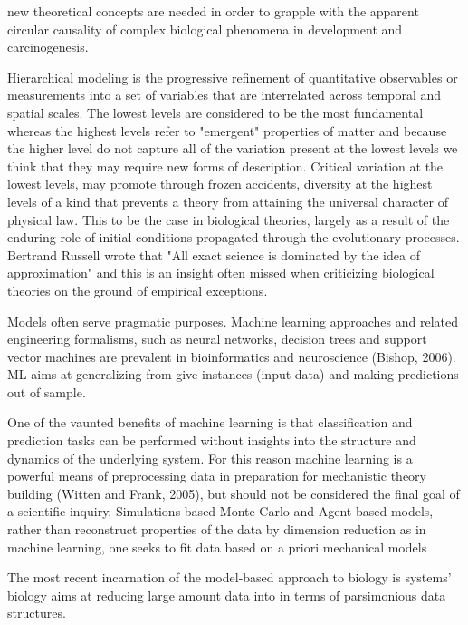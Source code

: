 \documentclass[onecollarge,runningheads]{svjour2}
\begin{document}
new theoretical concepts are needed in order to grapple with the apparent circular causality of complex biological phenomena in development and carcinogenesis.

Hierarchical  modeling is the progressive refinement of quantitative observables or measurements into a set of variables that are interrelated across temporal and spatial scales. The lowest levels are considered to be the most fundamental whereas the highest levels refer to "emergent" properties of matter and because the higher level do not capture all of the variation present at the lowest levels we think that they may require new forms of description.
Critical variation at the lowest levels, may promote through frozen accidents, diversity at the highest levels of a kind that prevents a theory from attaining the universal character of physical law.
This to be the case in biological theories, largely as a result of the enduring role of initial conditions propagated through the evolutionary processes. Bertrand Russell wrote that "All exact science is dominated by the idea of approximation" and this is an insight often missed when criticizing biological theories on the ground of empirical exceptions.

Models often serve pragmatic purposes. Machine learning approaches and related engineering formalisms, such as neural networks, decision trees and support vector machines are prevalent in bioinformatics and neuroscience (Bishop, 2006). ML aims at generalizing from give instances (input data) and making predictions out of sample.

One of the vaunted benefits of machine learning is that classification and prediction tasks can be performed without insights into the structure and dynamics of the underlying system. For this reason machine learning is a powerful means of preprocessing data in preparation for mechanistic theory building (Witten and Frank, 2005), but should not be considered the final goal of a scientific inquiry. Simulations based Monte Carlo and Agent based models, rather than reconstruct properties of the data by dimension reduction as in machine learning, one seeks to fit data based on a priori mechanical models

The most recent incarnation of the model-based approach to
biology is systems' biology aims at reducing large amount data into in terms of parsimonious data structures.
\end{document}
